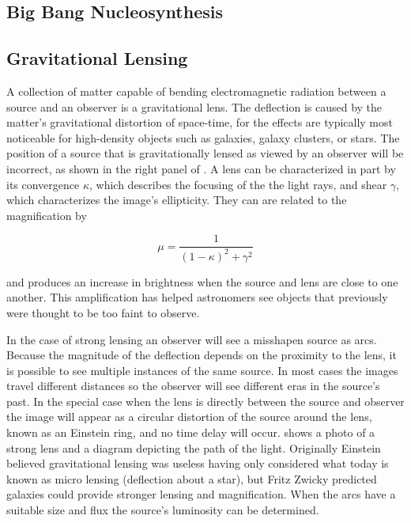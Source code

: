 \subsection{Big Bang Nucleosynthesis}



\subsection{Gravitational Lensing}
\label{subsec:gravitational_lensing}
A collection of matter capable of bending electromagnetic radiation between a source and an observer is a gravitational
lens.  The deflection is caused by the matter's gravitational distortion of space-time, for
the effects are typically most noticeable for high-density objects
such as galaxies, galaxy clusters, or stars.  The position of a source that is gravitationally lensed as viewed by an observer will be
incorrect, as shown in the right panel of .  A lens can be characterized in part by its convergence
$\kappa$, which describes the focusing of the the light rays, and shear $\gamma$, which characterizes the image's ellipticity.  They can
are related to the magnification by

\begin{equation}
\mu = \frac{1}{(1-\kappa)^{2} + \gamma^{2}}
\end{equation}

\noindent and produces an increase in brightness when the source and lens are close to one another.  This amplification has helped
astronomers see objects that previously were thought to be too faint to observe.

In the case of strong lensing an observer will see a misshapen source as arcs.  Because the magnitude of the
deflection depends on the proximity to the lens, it is possible to see multiple instances of the same source.  In most cases the images
travel different distances so the observer will see different eras in the source's past.  In the special case
when the lens is directly between the source and observer the image will appear as a circular distortion of the source around the lens,
known as an Einstein ring, and no time delay will occur.  
shows a photo of a strong lens and a diagram depicting the path of the light.  Originally Einstein
believed gravitational lensing was useless having only considered what today is known as micro lensing (deflection
about a star), but Fritz Zwicky predicted galaxies could provide stronger lensing and
magnification.  When the arcs have a suitable size and flux the source's luminosity can be determined.

